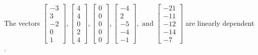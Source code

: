 \begin{exercise}
\begin{exerciseStatement}
  \end{exerciseStatement}
  \begin{exerciseAnswer}
   The vectors \(\left[\begin{array}{r}
-3 \\
3 \\
-2 \\
0 \\
1
\end{array}\right] , \left[\begin{array}{r}
4 \\
4 \\
0 \\
2 \\
4
\end{array}\right] , \left[\begin{array}{r}
0 \\
0 \\
0 \\
0 \\
0
\end{array}\right] , \left[\begin{array}{r}
-4 \\
2 \\
-5 \\
-4 \\
-1
\end{array}\right] , \text{ and } \left[\begin{array}{r}
-21 \\
-11 \\
-12 \\
-14 \\
-7
\end{array}\right]\) are 
  	 linearly dependent  .
  


  \end{exerciseAnswer}
\end{exercise}